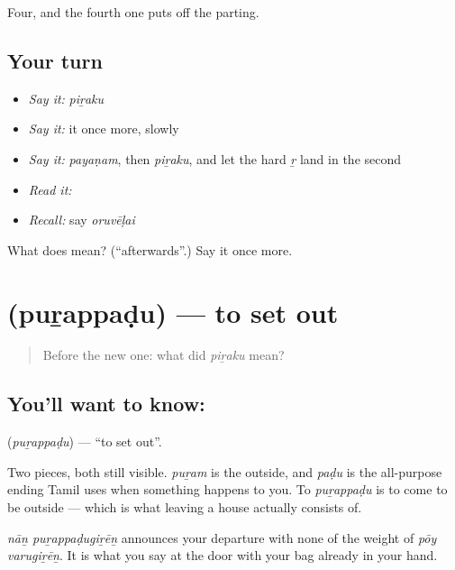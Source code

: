 \begin{grammarlens}[title={What you've built}]
Four, and the fourth one puts off the parting.
\end{grammarlens}

\subsection*{Your turn}
\begin{itemize}
\raggedright
  \item \emph{Say it:} \emph{piṟaku}
  \item \emph{Say it:} it once more, slowly
  \item \emph{Say it:} \emph{payaṇam}, then \emph{piṟaku}, and let the hard \emph{ṟ} land in the second
  \item \emph{Read it:} \textbf{}
  \item \emph{Recall:} say \emph{oruvēḷai}
\end{itemize}

\begin{tcolorbox}[breakable,colback=teal!4,colframe=teal!35!black,title={Before you move on}]
What does  mean? (\textquotedblleft{}afterwards\textquotedblright{}.) Say it once more.
\end{tcolorbox}
\section[\texorpdfstring{\ta{புறப்படு} (puṟappaḍu)}{புறப்படு (puṟappaḍu)}]{ (puṟappaḍu) — to set out}

\label{lesson:TA-C48-set-out}



\begin{quote}
Before the new one: what did \emph{piṟaku} mean?
\end{quote}

\subsection*{You'll want to know: }
\textbf{} (\emph{puṟappaḍu}) — \textquotedblleft{}to set out\textquotedblright{}.

Two pieces, both still visible. \emph{puṟam} is the outside, and \emph{paḍu} is the all-purpose ending Tamil uses when something happens to you. To \emph{puṟappaḍu} is to come to be outside — which is what leaving a house actually consists of.

\emph{nāṉ puṟappaḍugiṟēṉ} announces your departure with none of the weight of \emph{pōy varugiṟēṉ}. It is what you say at the door with your bag already in your hand.

